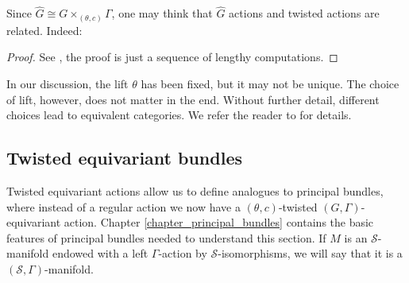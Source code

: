 Since \(\hat{G}\cong G\times_{(\theta, c)}\Gamma\), one may think that \(\hat{G}\) actions and twisted actions are related. Indeed:

\begin{proof}
    See \parencite[Prop. 2.7 and Prop. 2.12]{barajas2023non}, the proof is just a sequence of lengthy computations. 
\end{proof}

\begin{obs}  
    In our discussion, the lift \(\theta\) has been fixed, but it may not be unique. The choice of lift, however, does not matter in the end. Without further detail, different choices lead to equivalent categories. We refer the reader to \parencite[Sec. 4]{barajas2023non} for details.
\end{obs}

\subsection{Twisted equivariant bundles}
Twisted equivariant actions allow us to define analogues to principal bundles, where instead of a regular action we now have a \((\theta,c)\)-twisted \((G, \Gamma)\)-equivariant action. Chapter \ref{chapter_principal_bundles} contains the basic features of principal bundles needed to understand this section. If \(M\) is an \(\mathcal{S}\)-manifold endowed with a left \(\Gamma\)-action by \(\mathcal{S}\)-isomorphisms, we will say that it is a \((\mathcal{S},\Gamma)\)-manifold.\\

